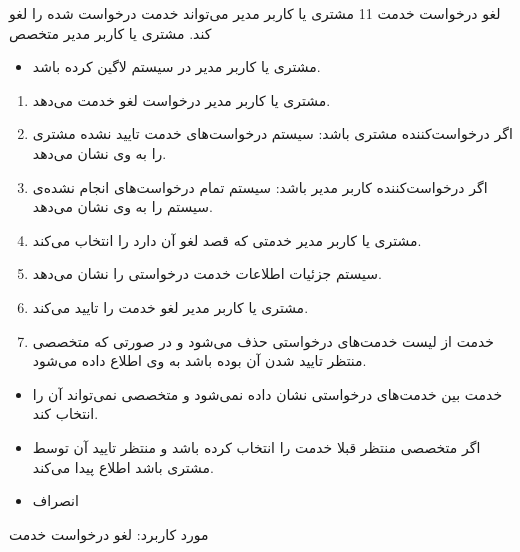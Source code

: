 {
\usecase
{
	لغو درخواست خدمت
}
{11}
{
	مشتری یا کاربر مدیر می‌تواند خدمت درخواست شده را لغو کند.
}
{
مشتری یا کاربر مدیر
}
{
	متخصص
}
{
	\begin{itemize}
		\vspace*{-0.6cm}
\item 
مشتری یا کاربر مدیر در سیستم لاگین کرده باشد.
	\end{itemize}
}
{
	\vspace*{-0.6cm}
	\begin{enumerate}
\item 
مشتری یا کاربر مدیر درخواست لغو خدمت می‌دهد.
\item اگر درخواست‌کننده مشتری باشد:
سیستم درخواست‌های خدمت تایید نشده مشتری را به وی نشان می‌دهد. 
\item اگر درخواست‌کننده کاربر مدیر باشد:
سیستم تمام درخواست‌های انجام نشده‌ی سیستم را به وی نشان می‌دهد. 
\item
مشتری یا کاربر مدیر خدمتی که قصد لغو آن دارد را انتخاب می‌کند.
\item
سیستم جزئیات اطلاعات خدمت درخواستی را نشان می‌دهد.
\item
مشتری یا کاربر مدیر لغو خدمت را تایید می‌کند.
\item
خدمت از لیست خدمت‌های درخواستی حذف می‌شود و در صورتی که متخصصی منتظر تایید شدن آن بوده باشد به وی اطلاع داده می‌شود.
	\end{enumerate}
}
{
		\begin{itemize}
		\vspace*{-0.6cm}
		\item 
خدمت بین خدمت‌های درخواستی نشان داده نمی‌شود و متخصصی نمی‌تواند آن را انتخاب کند.
		\item 
اگر متخصصی منتظر قبلا خدمت را انتخاب کرده باشد و منتظر تایید آن توسط مشتری باشد اطلاع پیدا می‌کند.
	\end{itemize}

}
{
			\begin{itemize}
		\vspace*{-0.6cm}
		\item
انصراف
\end{itemize}
}
{
	مورد کاربرد: لغو درخواست خدمت
}



}





